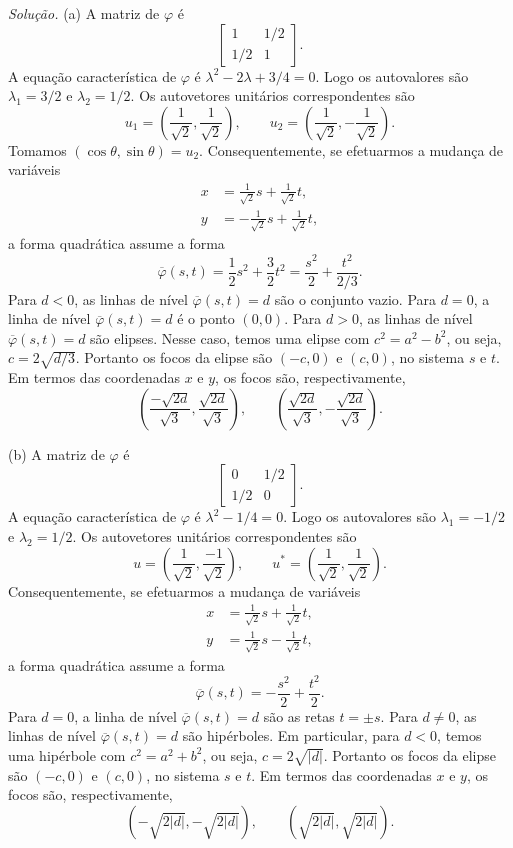 \documentclass[a4paper,11pt]{article}
\begin{document}
\emph{Solução.}
(a)
A matriz de $\varphi$ é
\[
  \begin{bmatrix}
    1 & 1/2 \\
    1/2 & 1
  \end{bmatrix}.
\]
A equação característica de $\varphi$ é $\lambda^2 - 2\lambda + 3/4 = 0$.
Logo os autovalores são $\lambda_1 = 3/2$ e $\lambda_2 = 1/2$.
Os autovetores unitários correspondentes são
\[
  u_1 = \left( \frac{1}{\sqrt{2}}, \frac{1}{\sqrt{2}} \right), \qquad u_2 = \left( \frac{1}{\sqrt{2}}, -\frac{1}{\sqrt{2}} \right).
\]
Tomamos $(\cos \theta, \sin \theta) = u_2$.
Consequentemente, se efetuarmos a mudança de variáveis
\begin{align*}
  x & = \frac{1}{\sqrt{2}} s + \frac{1}{\sqrt{2}} t, \\
  y & = -\frac{1}{\sqrt{2}} s + \frac{1}{\sqrt{2}} t,
\end{align*}
a forma quadrática assume a forma
\[
  \overline{\varphi}(s,t) = \frac{1}{2} s^2 + \frac{3}{2} t^2 = \frac{s^2}{2} + \frac{t^2}{2/3}.
\]
Para $d < 0$, as linhas de nível $\overline{\varphi}(s,t) = d$ são o conjunto vazio.
Para $d = 0$, a linha de nível $\overline{\varphi}(s,t) = d$ é o ponto $(0,0)$.
Para $d > 0$, as linhas de nível $\overline{\varphi}(s,t) = d$ são elipses.
Nesse caso, temos uma elipse com $c^2 = a^2 - b^2$, ou seja, $c = 2 \sqrt{d/3}$.
Portanto os focos da elipse são $(-c,0)$ e $(c,0)$, no sistema $s$ e $t$.
Em termos das coordenadas $x$ e $y$, os focos são, respectivamente,
\[
  \left( \frac{-\sqrt{2d}}{\sqrt{3}}, \frac{\sqrt{2d}}{\sqrt{3}} \right), \qquad \left( \frac{\sqrt{2d}}{\sqrt{3}}, -\frac{\sqrt{2d}}{\sqrt{3}} \right).
\]

(b)
A matriz de $\varphi$ é
\[
  \begin{bmatrix}
    0 & 1/2 \\
    1/2 & 0
  \end{bmatrix}.
\]
A equação característica de $\varphi$ é $\lambda^2 - 1/4 = 0$.
Logo os autovalores são $\lambda_1 = -1/2$ e $\lambda_2 = 1/2$.
Os autovetores unitários correspondentes são
\[
  u = \left( \frac{1}{\sqrt{2}}, \frac{-1}{\sqrt{2}} \right), \qquad u^* = \left( \frac{1}{\sqrt{2}}, \frac{1}{\sqrt{2}} \right).
\]
Consequentemente, se efetuarmos a mudança de variáveis
\begin{align*}
  x & = \frac{1}{\sqrt{2}} s + \frac{1}{\sqrt{2}} t, \\
  y & = \frac{1}{\sqrt{2}} s - \frac{1}{\sqrt{2}} t,
\end{align*}
a forma quadrática assume a forma
\[
  \overline{\varphi}(s,t) = -\frac{s^2}{2} + \frac{t^2}{2}.
\]
Para $d = 0$, a linha de nível $\overline{\varphi}(s,t) = d$ são as retas $t = \pm s$.
Para $d \neq 0$, as linhas de nível $\overline{\varphi}(s,t) = d$ são hipérboles.
Em particular, para $d < 0$, temos uma hipérbole com $c^2 = a^2 + b^2$, ou seja, $c = 2 \sqrt{|d|}$.
Portanto os focos da elipse são $(-c,0)$ e $(c,0)$, no sistema $s$ e $t$.
Em termos das coordenadas $x$ e $y$, os focos são, respectivamente,
\[
  ( -\sqrt{2|d|}, -\sqrt{2|d|}), \qquad ( \sqrt{2|d|}, \sqrt{2|d|} ).
\]
\end{document}
